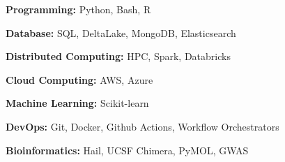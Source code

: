 \vspace{.8em}
\hspace{4em}\textcolor{accentcolor}{\faCode}\ \textbf{Programming:} Python, Bash, R\smallbreak

\hspace{4em}\textcolor{accentcolor}{\faDatabase}\ \textbf{Database:} SQL, DeltaLake, MongoDB, Elasticsearch\smallbreak

\hspace{4em}\textcolor{accentcolor}{\faServer}\ \textbf{Distributed Computing:} HPC, Spark, Databricks\smallbreak

\hspace{4em}\textcolor{accentcolor}{\faCloud}\ \textbf{Cloud Computing:} AWS, Azure\smallbreak

\hspace{4em}\textcolor{accentcolor}{\faBrain}\ \textbf{Machine Learning:} Scikit-learn\smallbreak

\hspace{4em}\textcolor{accentcolor}{\faProjectDiagram}\ \textbf{DevOps:} Git, Docker, Github Actions, Workflow Orchestrators\smallbreak

\hspace{4em}\textcolor{accentcolor}{\faDna}\ \textbf{Bioinformatics:} Hail, UCSF Chimera, PyMOL, GWAS
\\